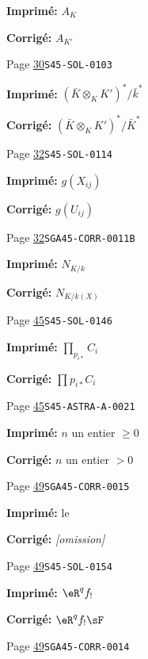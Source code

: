 \begin{description}
\par\noindent\textbf{Imprimé:} \(A_K\)
\par\noindent\textbf{Corrigé:} \(A_{K'}\)
\smallskip
\item[\hypertarget{apparatus:FR-0015}{15}] Page \hyperlink{printpage:fr:30}{30}\quad\texttt{S45-SOL-0103}
\par\noindent\textbf{Imprimé:} \((\bar K\otimes_K K')^*/\bar k^*\)
\par\noindent\textbf{Corrigé:} \((\bar K\otimes_K K')^*/\bar K^*\)
\smallskip
\item[\hypertarget{apparatus:FR-0016}{16}] Page \hyperlink{printpage:fr:32}{32}\quad\texttt{S45-SOL-0114}
\par\noindent\textbf{Imprimé:} \(g(X_{i j})\)
\par\noindent\textbf{Corrigé:} \(g(U_{i j})\)
\smallskip
\item[\hypertarget{apparatus:FR-0017}{17}] Page \hyperlink{printpage:fr:32}{32}\quad\texttt{SGA45-CORR-0011B}
\par\noindent\textbf{Imprimé:} \(N_{K/k}\)
\par\noindent\textbf{Corrigé:} \(N_{K/k(X)}\)
\smallskip
\item[\hypertarget{apparatus:FR-0018}{18}] Page \hyperlink{printpage:fr:45}{45}\quad\texttt{S45-SOL-0146}
\par\noindent\textbf{Imprimé:} \(\prod_{p_{i*}} C_i\)
\par\noindent\textbf{Corrigé:} \(\prod p_{i*} C_i\)
\smallskip
\item[\hypertarget{apparatus:FR-0019}{19}] Page \hyperlink{printpage:fr:45}{45}\quad\texttt{S45-ASTRA-A-0021}
\par\noindent\textbf{Imprimé:} $n$ un entier $\geqslant 0$
\par\noindent\textbf{Corrigé:} $n$ un entier $>0$
\smallskip
\item[\hypertarget{apparatus:FR-0020}{20}] Page \hyperlink{printpage:fr:49}{49}\quad\texttt{SGA45-CORR-0015}
\par\noindent\textbf{Imprimé:} le 
\par\noindent\textbf{Corrigé:} \emph{\textnormal{[omission]}}
\smallskip
\item[\hypertarget{apparatus:FR-0021}{21}] Page \hyperlink{printpage:fr:49}{49}\quad\texttt{S45-SOL-0154}
\par\noindent\textbf{Imprimé:} \(\eR^q f_!\)
\par\noindent\textbf{Corrigé:} \(\eR^q f_! \sF\)
\smallskip
\item[\hypertarget{apparatus:FR-0022}{22}] Page \hyperlink{printpage:fr:49}{49}\quad\texttt{SGA45-CORR-0014}

\end{description}
